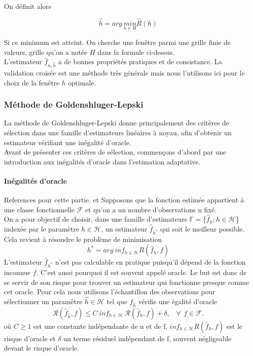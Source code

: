 \documentclass[
]{book}
\begin{document}
On définit alors

\[
\hat{h} = arg\ \underset{h\in H}{min}\hat{R}(h)
\]

Si ce minimum est atteint. On cherche une fenêtre parmi une grille finie de valeurs, grille qu'on a notée \(H\) dans la formule ci-dessus.\\
L'estimateur \(\hat{f}_{n,\hat{h}}\) a de bonnes propriétés pratiques et de consistance.
La validation croisée est une méthode très générale mais nous l'utilisons ici pour le choix de la fenêtre \(h\) optimale.

\hypertarget{muxe9thode-de-goldenshluger-lepski}{%
\subsubsection{Méthode de Goldenshluger-Lepski}\label{muxe9thode-de-goldenshluger-lepski}}

La méthode de Goldenshluger-Lepski donne principalement des critères de sélection dans une famille d'estimateurs linéaires à noyau, afin d'obtenir un estimateur vérifiant une inégalité d'oracle.\\
Avant de présenter ces critères de sélection, commençons d'abord par une introduction aux inégalités d'oracle dans l'estimation adaptative.

\hypertarget{inuxe9galituxe9s-doracle}{%
\paragraph{Inégalités d'oracle}\label{inuxe9galituxe9s-doracle}}

References pour cette partie.\label{eq:oracle} et \label{eq:est-ad} \newline
Supposons que la fonction estimée appartient à une classe fonctionnelle \(\mathcal{F}\) et qu'on a un nombre d'observations n fixé.\\
On a pour objectif de choisir, dans une famille d'estimateurs \(\mathbb{F} =\)\{\(\hat{f}_h ; h\in \mathcal{H}\)\} indexée par le paramètre \(h \in \mathcal{H}\), un estimateur \(\hat{f}_{h^*}\) qui soit le meilleur possible.\\
Cela revient à résoudre le problème de minimisation
\[
h^*=arg~inf_{h \in \mathcal{H}} R(\hat{f}_h,f)
\]
L'estimateur \(\hat{f}_{h^*}\) n'est pas calculable en pratique puisqu'il dépend de la fonction inconnue \(f\). C'est aussi pourquoi il est souvent appelé oracle. Le but est donc de se servir de son risque pour trouver un estimateur qui fonctionne presque comme cet oracle. Pour cela nous utilisons l'échantillon des observations pour sélectionner un paramètre \(\hat{h} \in \mathcal{H}\) tel que \(\hat{f}_{\hat{h}}\) vérifie une égalité d'oracle
\[
\mathcal{R}(\hat{f}_{\hat{h}},f) \leq C~inf_{h\in \mathcal{H}}~\mathcal{R}(\hat{f}_{h},f)+\delta,~~~~\forall~~f \in \mathcal{F}.
\]
où \(C \geq 1\) est une constante indépendante de n et de f, \(inf_{h\in \mathcal{H}}R(\hat{f}_h,f)\) est le risque d'oracle et \(\delta\) un terme résiduel indépendant de f, souvent négligeable devant le risque d'oracle.\\
\end{document}
